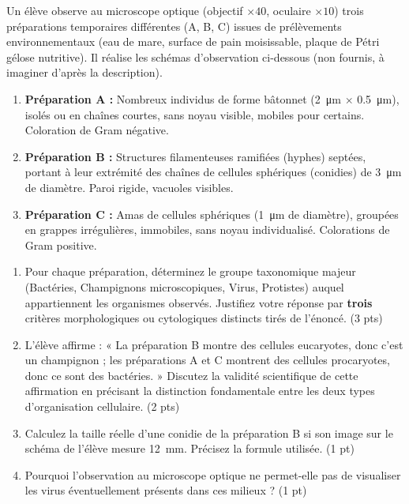 \documentclass[11pt]{article}
\begin{document}
\begin{exercice}
Un élève observe au microscope optique (objectif $\times 40$, oculaire $\times 10$) trois préparations temporaires différentes (A, B, C) issues de prélèvements environnementaux (eau de mare, surface de pain moisissable, plaque de Pétri gélose nutritive). Il réalise les schémas d'observation ci-dessous (non fournis, à imaginer d'après la description).

\begin{enumerate}
    \item \textbf{Préparation A :} Nombreux individus de forme bâtonnet (\SI{2}{\micro\meter} $\times$ \SI{0,5}{\micro\meter}), isolés ou en chaînes courtes, sans noyau visible, mobiles pour certains. Coloration de Gram négative.
    \item \textbf{Préparation B :} Structures filamenteuses ramifiées (hyphes) septées, portant à leur extrémité des chaînes de cellules sphériques (conidies) de \SI{3}{\micro\meter} de diamètre. Paroi rigide, vacuoles visibles.
    \item \textbf{Préparation C :} Amas de cellules sphériques (\SI{1}{\micro\meter} de diamètre), groupées en grappes irrégulières, immobiles, sans noyau individualisé. Colorations de Gram positive.
\end{enumerate}
\begin{enumerate}
    \item Pour chaque préparation, déterminez le groupe taxonomique majeur (Bactéries, Champignons microscopiques, Virus, Protistes) auquel appartiennent les organismes observés. Justifiez votre réponse par \textbf{trois} critères morphologiques ou cytologiques distincts tirés de l'énoncé. (3 pts)
    \item L'élève affirme : « La préparation B montre des cellules eucaryotes, donc c'est un champignon ; les préparations A et C montrent des cellules procaryotes, donc ce sont des bactéries. » Discutez la validité scientifique de cette affirmation en précisant la distinction fondamentale entre les deux types d'organisation cellulaire. (2 pts)
    \item Calculez la taille réelle d'une conidie de la préparation B si son image sur le schéma de l'élève mesure \SI{12}{\milli\meter}. Précisez la formule utilisée. (1 pt)
    \item Pourquoi l'observation au microscope optique ne permet-elle pas de visualiser les virus éventuellement présents dans ces milieux ? (1 pt)
\end{enumerate}
\end{exercice}
\end{document}

